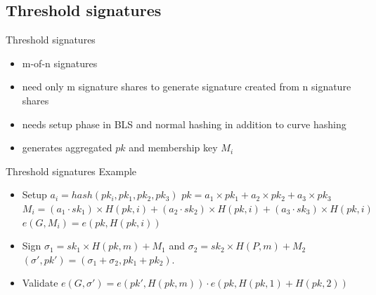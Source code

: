 \documentclass{beamer}
\begin{document}
\subsection{Threshold signatures}
\begin{frame}{Threshold signatures}
	\begin{itemize}
		\item m-of-n signatures
		\item need only m signature shares to generate signature created from n signature shares
		\item needs setup phase in BLS and normal hashing in addition to curve hashing
		\item generates aggregated $pk$ and membership key $M_i$		
	\end{itemize}
\end{frame}
\begin{frame}{Threshold signatures}
	Example
	\begin{itemize}
		\item Setup \newline
		$a_i = hash(pk_i,{pk_1,pk_2,pk_3})$ \newline
		$pk = a_1\times{pk_1}+a_2\times{pk_2}+a_3\times{pk_3}$ \newline
		$M_i = (a_1 \cdot sk_1) \times{H(pk,i)} + (a_2 \cdot sk_2) \times{H(pk,i)} + (a_3 \cdot sk_3) \times{H(pk,i)}$ \newline
		$e(G,M_i) = e(pk,H(pk,i))$
		\item Sign \newline
		$\sigma_1 = sk_1 \times{H(pk,m)} + M_1$ and $\sigma_2 = sk_2 \times{H(P,m)} + M_2$
		$(\sigma',pk') = (\sigma_1 + \sigma_2, pk_1 + pk_2)$.
		\item Validate \newline
		$e(G,\sigma') = e(pk',H(pk,m)) \cdot e(pk, H(pk,1)+H(pk,2))$
	\end{itemize}
\end{frame}
\end{document}
